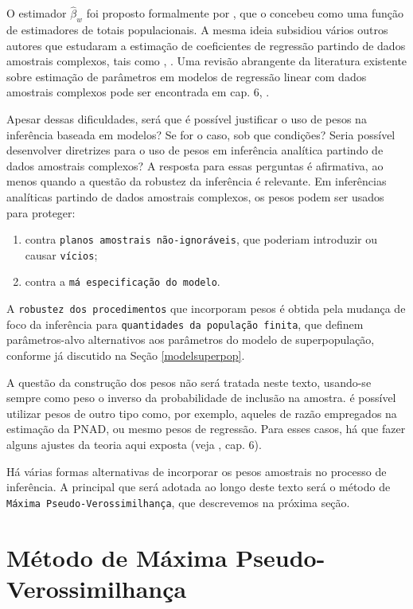 \documentclass[]{book}
\theoremstyle{definition}
\theoremstyle{definition}
\theoremstyle{definition}
\theoremstyle{remark}
\begin{document}
O estimador \(\widehat{\beta }_{w}\) foi proposto formalmente por
\citep{fuller75}, que o concebeu como uma função de estimadores de
totais populacionais. A mesma ideia subsidiou vários outros autores que
estudaram a estimação de coeficientes de regressão partindo de dados
amostrais complexos, tais como \citep{NH80}, \citep{PfefeNat}. Uma
revisão abrangente da literatura existente sobre estimação de parâmetros
em modelos de regressão linear com dados amostrais complexos pode ser
encontrada em cap. 6, \citep{Silva}.

Apesar dessas dificuldades, será que é possível justificar o uso de
pesos na inferência baseada em modelos? Se for o caso, sob que
condições? Seria possível desenvolver diretrizes para o uso de pesos em
inferência analítica partindo de dados amostrais complexos? A resposta
para essas perguntas é afirmativa, ao menos quando a questão da robustez
da inferência é relevante. Em inferências analíticas partindo de dados
amostrais complexos, os pesos podem ser usados para proteger:

\begin{enumerate}
\def\labelenumi{\arabic{enumi}.}
\item
  contra \texttt{planos\ amostrais\ não-ignoráveis}, que poderiam
  introduzir ou causar \texttt{vícios};
\item
  contra a \texttt{má\ especificação\ do\ modelo}.
\end{enumerate}

A \texttt{robustez\ dos\ procedimentos} que incorporam pesos é obtida
pela mudança de foco da inferência para
\texttt{quantidades\ da\ população\ finita}, que definem parâmetros-alvo
alternativos aos parâmetros do modelo de superpopulação, conforme já
discutido na Seção \ref{modelsuperpop}.

A questão da construção dos pesos não será tratada neste texto,
usando-se sempre como peso o inverso da probabilidade de inclusão na
amostra. é possível utilizar pesos de outro tipo como, por exemplo,
aqueles de razão empregados na estimação da PNAD, ou mesmo pesos de
regressão. Para esses casos, há que fazer alguns ajustes da teoria aqui
exposta (veja \citep{Silva}, cap. 6).

Há várias formas alternativas de incorporar os pesos amostrais no
processo de inferência. A principal que será adotada ao longo deste
texto será o método de \texttt{Máxima\ Pseudo-Verossimilhança}, que
descrevemos na próxima seção.

\section{Método de Máxima Pseudo-Verossimilhança}\label{modpar3}
\end{document}
